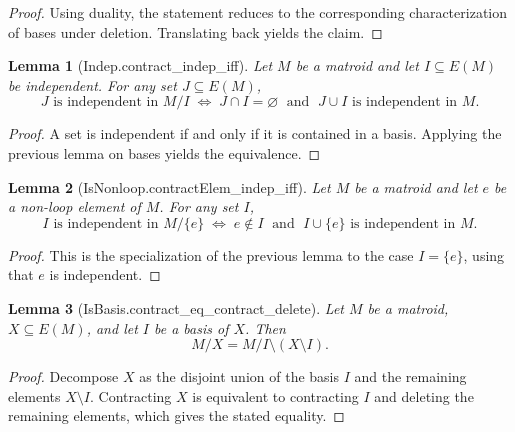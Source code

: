 \documentclass{article}
\newtheorem{lemma}{Lemma}
\begin{document}
\begin{proof}
Using duality, the statement reduces to the corresponding characterization of bases
under deletion.
Translating back yields the claim.
\end{proof}

\begin{lemma}[Indep.contract_indep_iff]
Let \( M \) be a matroid and let \( I \subseteq E(M) \) be independent.
For any set \( J \subseteq E(M) \),
\[
J \text{ is independent in } M / I
\;\Longleftrightarrow\;
J \cap I = \varnothing
\;\text{ and }\;
J \cup I \text{ is independent in } M .
\]
\end{lemma}

\begin{proof}
A set is independent if and only if it is contained in a basis.
Applying the previous lemma on bases yields the equivalence.
\end{proof}

\begin{lemma}[IsNonloop.contractElem_indep_iff]
Let \( M \) be a matroid and let \( e \) be a non-loop element of \( M \).
For any set \( I \),
\[
I \text{ is independent in } M / \{e\}
\;\Longleftrightarrow\;
e \notin I
\;\text{ and }\;
I \cup \{e\} \text{ is independent in } M .
\]
\end{lemma}

\begin{proof}
This is the specialization of the previous lemma to the case \( I = \{e\} \),
using that \( e \) is independent.
\end{proof}

\begin{lemma}[IsBasis.contract_eq_contract_delete]
Let \( M \) be a matroid, \( X \subseteq E(M) \), and let \( I \) be a basis of \( X \).
Then
\[
M / X = M / I \setminus (X \setminus I).
\]
\end{lemma}

\begin{proof}
Decompose \( X \) as the disjoint union of the basis \( I \) and the remaining elements
\( X \setminus I \).
Contracting \( X \) is equivalent to contracting \( I \) and deleting the remaining elements,
which gives the stated equality.
\end{proof}
\end{document}

